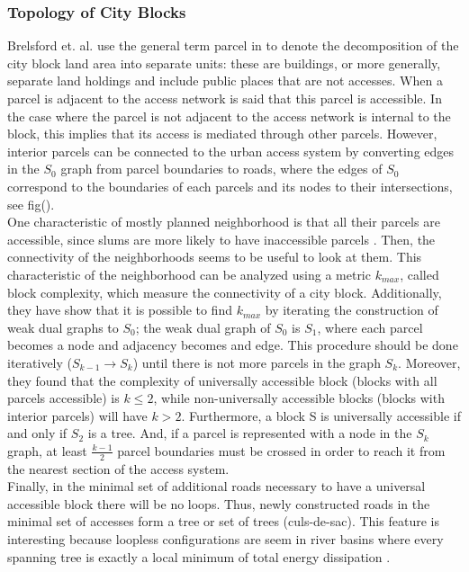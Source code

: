 \documentclass[10pt]{article}
\begin{document}
\subsubsection{Topology of City Blocks}

Brelsford et. al. use the general term parcel in \cite{bre} to denote the decomposition of the city block land area into separate units: these are buildings, or more generally, separate land holdings and include public places that are not accesses. When a parcel is adjacent to the access network is said that this parcel is accessible. In the case where the parcel is not adjacent to the access network is internal to the block, this implies that its access is mediated through other parcels. However, interior parcels can be connected to the urban access system by converting edges in the $S_0$ graph from parcel boundaries to roads, where the edges of $S_0$ correspond to the boundaries of each parcels and its nodes to their intersections, see fig().\\

One characteristic of mostly planned neighborhood is that all their parcels are accessible, since slums are more likely to have inaccessible parcels \cite{unh}. Then, the connectivity of the neighborhoods seems to be useful to look at them. This characteristic of the neighborhood can be analyzed using a metric $k_{max}$, called block complexity, which measure the connectivity of a city block. Additionally, they have show that it is possible to find $k_{max}$ by iterating the construction of weak dual graphs to $S_0$; the weak dual graph of $S_0$ is $S_1$, where each parcel becomes a node and adjacency becomes and edge. This procedure should be done iteratively ($S_{k-1}\longrightarrow S_k$) until there is not more parcels in the graph $S_k$. Moreover, they found that the complexity of universally accessible block (blocks with all parcels accessible) is $k \leq 2$, while non-universally accessible blocks (blocks with interior parcels) will have $k>2$. Furthermore, a block S is universally accessible if and only if $S_2$ is a tree. And, if a parcel is represented with a node in the $S_k$ graph, at least $\frac{k-1}{2}$ parcel boundaries must be crossed in order to reach it from the nearest section of the access system.\\

Finally, in the minimal set of additional roads necessary to have a universal accessible block there will be no loops. Thus, newly constructed roads in the minimal set of accesses form a tree or set of trees (culs-de-sac). This feature is interesting because loopless configurations are seem in river basins where every spanning tree is exactly a local minimum of total energy dissipation \cite{and}.\\
\end{document}
